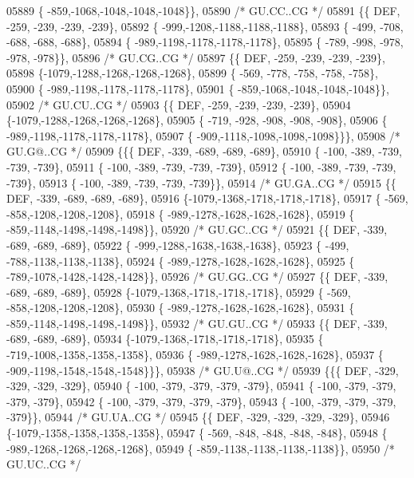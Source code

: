 \begin{DoxyCode}
05889 \{ -859,-1068,-1048,-1048,-1048\}\},
05890 \textcolor{comment}{/* GU.CC..CG */}
05891 \{\{  DEF, -259, -239, -239, -239\},
05892 \{ -999,-1208,-1188,-1188,-1188\},
05893 \{ -499, -708, -688, -688, -688\},
05894 \{ -989,-1198,-1178,-1178,-1178\},
05895 \{ -789, -998, -978, -978, -978\}\},
05896 \textcolor{comment}{/* GU.CG..CG */}
05897 \{\{  DEF, -259, -239, -239, -239\},
05898 \{-1079,-1288,-1268,-1268,-1268\},
05899 \{ -569, -778, -758, -758, -758\},
05900 \{ -989,-1198,-1178,-1178,-1178\},
05901 \{ -859,-1068,-1048,-1048,-1048\}\},
05902 \textcolor{comment}{/* GU.CU..CG */}
05903 \{\{  DEF, -259, -239, -239, -239\},
05904 \{-1079,-1288,-1268,-1268,-1268\},
05905 \{ -719, -928, -908, -908, -908\},
05906 \{ -989,-1198,-1178,-1178,-1178\},
05907 \{ -909,-1118,-1098,-1098,-1098\}\}\},
05908 \textcolor{comment}{/* GU.G@..CG */}
05909 \{\{\{  DEF, -339, -689, -689, -689\},
05910 \{ -100, -389, -739, -739, -739\},
05911 \{ -100, -389, -739, -739, -739\},
05912 \{ -100, -389, -739, -739, -739\},
05913 \{ -100, -389, -739, -739, -739\}\},
05914 \textcolor{comment}{/* GU.GA..CG */}
05915 \{\{  DEF, -339, -689, -689, -689\},
05916 \{-1079,-1368,-1718,-1718,-1718\},
05917 \{ -569, -858,-1208,-1208,-1208\},
05918 \{ -989,-1278,-1628,-1628,-1628\},
05919 \{ -859,-1148,-1498,-1498,-1498\}\},
05920 \textcolor{comment}{/* GU.GC..CG */}
05921 \{\{  DEF, -339, -689, -689, -689\},
05922 \{ -999,-1288,-1638,-1638,-1638\},
05923 \{ -499, -788,-1138,-1138,-1138\},
05924 \{ -989,-1278,-1628,-1628,-1628\},
05925 \{ -789,-1078,-1428,-1428,-1428\}\},
05926 \textcolor{comment}{/* GU.GG..CG */}
05927 \{\{  DEF, -339, -689, -689, -689\},
05928 \{-1079,-1368,-1718,-1718,-1718\},
05929 \{ -569, -858,-1208,-1208,-1208\},
05930 \{ -989,-1278,-1628,-1628,-1628\},
05931 \{ -859,-1148,-1498,-1498,-1498\}\},
05932 \textcolor{comment}{/* GU.GU..CG */}
05933 \{\{  DEF, -339, -689, -689, -689\},
05934 \{-1079,-1368,-1718,-1718,-1718\},
05935 \{ -719,-1008,-1358,-1358,-1358\},
05936 \{ -989,-1278,-1628,-1628,-1628\},
05937 \{ -909,-1198,-1548,-1548,-1548\}\}\},
05938 \textcolor{comment}{/* GU.U@..CG */}
05939 \{\{\{  DEF, -329, -329, -329, -329\},
05940 \{ -100, -379, -379, -379, -379\},
05941 \{ -100, -379, -379, -379, -379\},
05942 \{ -100, -379, -379, -379, -379\},
05943 \{ -100, -379, -379, -379, -379\}\},
05944 \textcolor{comment}{/* GU.UA..CG */}
05945 \{\{  DEF, -329, -329, -329, -329\},
05946 \{-1079,-1358,-1358,-1358,-1358\},
05947 \{ -569, -848, -848, -848, -848\},
05948 \{ -989,-1268,-1268,-1268,-1268\},
05949 \{ -859,-1138,-1138,-1138,-1138\}\},
05950 \textcolor{comment}{/* GU.UC..CG */}

\end{DoxyCode}
